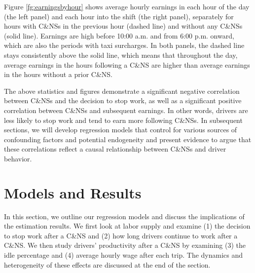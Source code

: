 \documentclass[reviewmode]{AEA}
\begin{document}
Figure \ref{fg:earningsbyhour} shows average hourly earnings in each hour of the day (the left panel) and each hour into the shift (the right panel), separately for hours with C\&NSs in the previous hour (dashed line) and without any C\&NSs (solid line). Earnings are high before 10:00 a.m. and from 6:00 p.m. onward, which are also the periods with taxi surcharges. In both panels, the dashed line stays consistently above the solid line, which means that throughout the day, average earnings in the hours following a C\&NS are higher than  average earnings in the hours without a prior C\&NS.

The above statistics and figures demonstrate a significant negative correlation between C\&NSs and the decision to stop work, as well as a significant positive correlation between C\&NSs and subsequent earnings. In other words, drivers are less likely to stop work and tend to earn more following C\&NSs. In subsequent sections, we will develop regression models  that control for various sources of confounding factors and potential endogeneity and present evidence to argue that these correlations reflect a causal relationship between C\&NSs and driver behavior.

\section{Models and Results}
In this section, we outline our regression models and discuss the implications of the estimation results. We first look at labor supply and examine (1) the decision to stop work after a C\&NS and (2) how long drivers continue to work after a C\&NS. We then study drivers' productivity after a C\&NS by examining (3) the idle percentage and (4) average hourly wage after each trip. The dynamics and heterogeneity of these effects are discussed at the end of the section.
\end{document}

